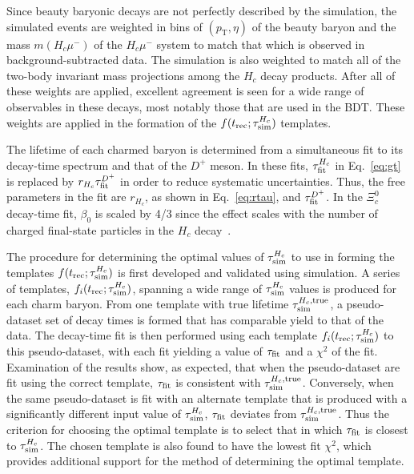 \documentclass[12pt,a4paper]{article}
\def\Pmu         {\ensuremath{\upmu}\xspace}
\def\PXi         {\ensuremath{\Xi}\xspace}
\def\PD      {\ensuremath{\mathrm{D}}\xspace}
\def\Pc      {\ensuremath{\mathrm{c}}\xspace}
\def\Pmu         {\ensuremath{\mu}\xspace}
\def\PD      {\ensuremath{D}\xspace}
\def\Pc      {\ensuremath{c}\xspace}
\def\mun        {{\ensuremath{\Pmu^-}}\xspace} \def\mupm       {{\ensuremath{\Pmu^\pm}}\xspace}
\def\cquark    {{\ensuremath{\Pc}}\xspace}
\def\D       {{\ensuremath{\PD}}\xspace}
\def\Dp      {{\ensuremath{\D^+}}\xspace}
\def\Xires       {{\ensuremath{\PXi}}\xspace}
\def\Xicz        {{\ensuremath{\Xires^0_\cquark}}\xspace}
\def\pt         {\ensuremath{p_{\mathrm{T}}}\xspace}
\begin{document}
Since beauty baryonic decays are not perfectly described by the simulation, the simulated events are weighted in bins of
$(\pt,\eta)$ of the beauty baryon and the mass $m(H_c\mun)$ of the $H_c\mun$ system to match that which is
observed in background-subtracted data. The simulation is also weighted to match all of the
two-body invariant mass projections among the $H_c$ decay products. After all of these weights are applied, excellent agreement
is seen for a wide range of observables in these decays, most notably those that are used in the BDT. These 
weights are applied in the formation of the $f(t_{\rm rec};\tau_{\rm sim}^{H_c})$ templates. 

The lifetime of each charmed baryon is determined from a simultaneous fit to its decay-time spectrum and that
of the $\Dp$ meson. In these fits, $\tau_{\rm fit}^{H_c}$ in Eq.~\eqref{eq:gt} is replaced by $r_{H_c}\tau_{\rm fit}^{\Dp}$
in order to reduce systematic uncertainties. Thus,
the free parameters in the fit are $r_{H_c}$, as shown in Eq.~\eqref{eq:rtau}, and $\tau_{\rm fit}^{\Dp}$. 
In the $\Xicz$ decay-time fit, $\beta_0$ is scaled by 4/3 since the effect scales with the number of charged 
final-state particles in the $H_c$ decay~\cite{LHCb-PAPER-2013-065}.

The procedure for determining the optimal values of $\tau_{\rm sim}^{H_c}$ to use in forming the templates $f(t_{\rm rec};\tau_{\rm sim}^{H_c})$ 
is first developed and validated using simulation. A series of templates, $f_i(t_{\rm rec};\tau_{\rm sim}^{H_c})$, spanning a wide range of 
$\tau_{\rm sim}^{H_c}$ values is produced for
each charm baryon. From one template with true lifetime $\tau_{\rm sim}^{H_c,\rm true}$, a pseudo-dataset set of decay times is formed that has comparable yield to 
that of the data. The decay-time fit is then performed using each template $f_i(t_{\rm rec};\tau_{\rm sim}^{H_c})$ to this pseudo-dataset, with each fit yielding a value of 
$\tau_{\rm fit}$ and a $\chi^2$ of the fit. Examination of the results show, as expected, that when the pseudo-dataset are fit using the correct template, 
$\tau_{\rm fit}$ is consistent with $\tau_{\rm sim}^{H_c, \rm true}$. 
Conversely, when the same pseudo-dataset is fit with an alternate template that is produced with a significantly different input 
value of $\tau_{\rm sim}^{H_c}$, $\tau_{\rm fit}$ deviates from $\tau_{\rm sim}^{H_c, \rm true}$. Thus the criterion for choosing the optimal template is to 
select that in which $\tau_{\rm fit}$ is closest to $\tau_{\rm sim}^{H_c}$. The chosen template is also found to have the lowest fit $\chi^2$, 
which provides additional support for the method of determining the optimal template. 
\end{document}
